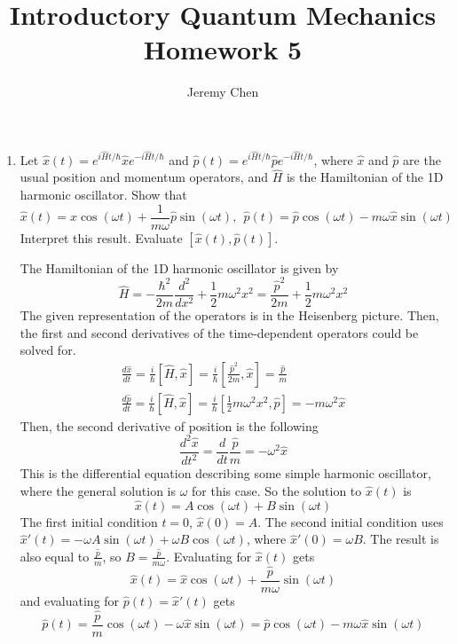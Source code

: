 \documentclass[10pt,letterpaper]{article}
\title{Introductory Quantum Mechanics Homework 5}
\author{Jeremy Chen}
\begin{document}
	\maketitle
	
\begin{enumerate}

\item Let $\hat{x}(t) = e^{i\hat{H}t/\hbar}\hat{x}e^{-i\hat{H}t/\hbar}$ and $\hat{p}(t) = e^{i\hat{H}t/\hbar}\hat{p}e^{-i\hat{H}t/\hbar}$, where $\hat{x}$ and $\hat{p}$ are the usual position and momentum operators, and $\hat{H}$ is the Hamiltonian of the 1D harmonic oscillator. Show that
$$\hat{x}(t) = \hat{x}\cos(\omega t) + \frac{1}{m\omega}\hat{p}\sin(\omega t),\ \ \hat{p}(t) = \hat{p}\cos(\omega t) - m\omega\hat{x}\sin(\omega t)$$
Interpret this result. Evaluate $[\hat{x}(t), \hat{p}(t)]$. 

\color{violet}
The Hamiltonian of the 1D harmonic oscillator is given by
$$\hat{H} = -\frac{\hbar^{2}}{2m}\frac{d^{2}}{dx^{2}} + \frac{1}{2}m\omega^{2}x^{2} = \frac{\hat{p}^{2}}{2m} + \frac{1}{2}m\omega^{2}x^{2}$$
The given representation of the operators is in the Heisenberg picture. Then, the first and second derivatives of the time-dependent operators could be solved for. 
\begin{gather*}
\frac{d\hat{x}}{dt} = \frac{i}{\hbar}[\hat{H}, \hat{x}] = \frac{i}{\hbar} \left[ \frac{\hat{p}^{2}}{2m}, \hat{x} \right] = \frac{\hat{p}}{m} \\
\frac{d\hat{p}}{dt} = \frac{i}{\hbar} \left[\hat{H}, \hat{x} \right] = \frac{i}{\hbar} \left[ \frac{1}{2}m\omega^{2}x^{2}, \hat{p} \right] = -m\omega^{2}\hat{x}
\end{gather*}
Then, the second derivative of position is the following
$$\frac{d^{2}\hat{x}}{dt^{2}} = \frac{d}{dt} \frac{\hat{p}}{m} = -\omega^{2}\hat{x}$$
This is the differential equation describing some simple harmonic oscillator, where the general solution is $\omega$ for this case. So the solution to $\hat{x}(t)$ is
$$\hat{x}(t) = A\cos(\omega t) + B\sin(\omega t)$$
The first initial condition $t = 0$, $\hat{x}(0) = A$. The second initial condition uses $\hat{x}'(t) = -\omega A\sin(\omega t) + \omega B\cos(\omega t)$, where $\hat{x}'(0) = \omega B$. The result is also equal to $\frac{\hat{p}}{m}$, so $B = \frac{\hat{p}}{m\omega}$. Evaluating for $\hat{x}(t)$ gets
$$\hat{x}(t) = \hat{x}\cos(\omega t) + \frac{\hat{p}}{m\omega}\sin(\omega t)$$
and evaluating for $\hat{p}(t) = \hat{x}'(t)$ gets
$$\hat{p}(t) = \frac{\hat{p}}{m}\cos(\omega t) - \omega\hat{x}\sin(\omega t) = \hat{p}\cos(\omega t) - m\omega\hat{x}\sin(\omega t)$$
\color{black}


\end{enumerate}
\end{document}
